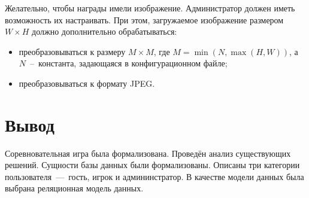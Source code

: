 Желательно, чтобы награды имели изображение. Администратор должен иметь возможность их настраивать. При этом, загружаемое изображение размером $W \times H$ должно дополнительно обрабатываться:
\begin{itemize}
	\item преобразовываться к размеру $M \times M$, где $M=\min(N,\max(H,W))$, а $N$~--~константа, задающаяся в конфигурационном файле;
	\item преобразовываться к формату JPEG.
\end{itemize}

\section*{Вывод}

Соревновательная игра была формализована. Проведён анализ существующих решений. Сущности базы данных были формализованы. Описаны три категории пользователя~---~гость, игрок и админинстратор. В качестве модели данных была выбрана реляционная модель данных. 

\clearpage
